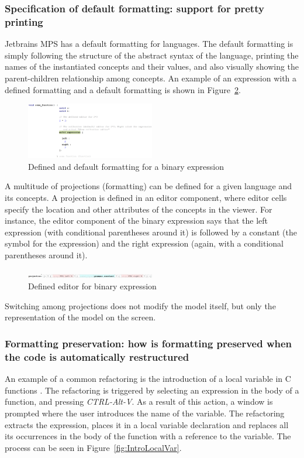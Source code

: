\documentclass[preprint,numbers,10pt]{sigplanconf}
\begin{document}
\subsubsection{Specification of default formatting: support for pretty printing}
Jetbrains MPS has a default formatting for languages. The default formatting is simply following
the structure of the abstract syntax of the language, printing the names of the instantiated concepts and
their values, and also visually showing the parent-children relationship among concepts.
An example of an expression with a defined formatting and
a default formatting is shown in Figure~\ref{fig:DefaultEditor}.

\begin{figure}[H]
	\centering
	\includegraphics[width=0.50\textwidth]{screens/DefaultEditor.png}
	\caption{Defined and default formatting for a binary expression}
	\label{fig:DefaultEditor}
\end{figure}

A multitude of projections (formatting) can be defined for a given language and its concepts.
A projection is defined in an editor component, where editor cells specify the location and other attributes
of the concepts in the viewer. For instance, the editor component of the binary expression
says that the left expression (with conditional parentheses around it) is followed by a constant (the
symbol for the expression) and the right expression (again, with a conditional parentheses around it).

\begin{figure}[H]
	\centering
	\includegraphics[width=0.50\textwidth]{screens/EditorMultiExpression.png}
	\caption{Defined editor for binary expression}
	\label{fig:DefaultEditor}
\end{figure}

Switching among projections does not modify the model itself, but only the representation of the model
on the screen.

\subsubsection{Formatting preservation: how is formatting preserved when the code is automatically restructured}
An example of a common refactoring is the introduction of a local variable in C functions \cite{voelter2014generic}.
The refactoring is triggered by selecting an expression in the body of a function, and pressing \emph{CTRL-Alt-V}.
As a result of this action, a window is prompted where the user introduces the name of the variable.
The refactoring extracts the expression, places it in a
local variable declaration and replaces all its occurrences in the body of the function with a reference to the variable.
The process can be seen in Figure~\ref{fig:IntroLocalVar}.
\end{document}
